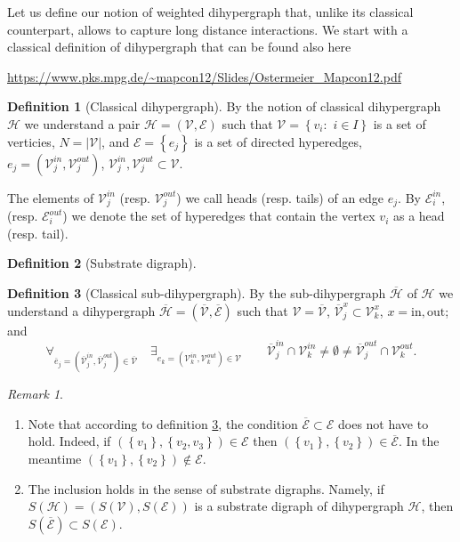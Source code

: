 \documentclass[a4paper,12pt]{article}
\theoremstyle{definition}
\newtheorem{definition}{Definition}%
\theoremstyle{remark}
\newtheorem{remark}{Remark}%
\newcommand{\HH}{\mathcal{H}}
\newcommand{\bHH}{\overline{\mathcal{H}}}
\newcommand{\V}{\mathcal{V}}
\newcommand{\bV}{\overline{\mathcal{V}}}
\newcommand{\E}{\mathcal{E}}
\newcommand{\bE}{\overline{\mathcal{E}}}
\begin{document}
Let us define our notion of weighted dihypergraph that, unlike its classical counterpart, allows to capture long distance interactions. We start with a classical definition of dihypergraph that can be found also here\newline

\url{https://www.pks.mpg.de/~mapcon12/Slides/Ostermeier_Mapcon12.pdf}

\begin{definition}[Classical dihypergraph]
By the notion of classical dihypergraph $\HH$ we understand a pair $\HH =\left(\V,\E\right)$ such that $\V=\left\{ v_i:\,\,i\in I\right\}$ is a set of verticies, $N=|\V|$,  and $\E=\left\{e_j\right\}$ is a set of directed hyperedges, $e_j=(\V_j^{in},\V_j^{out})$, $\V_j^{in},\V_j^{out}\subset \V$.
\end{definition}
The elements of $\V_j^{in}$ (resp. $\V_j^{out}$) we call heads (resp. tails) of an edge $e_j$. By $\E_i^{in}$, (resp. $ \E_i^{out}$) we denote the set of hyperedges that contain the vertex $v_i$ as a head (resp. tail).

\begin{definition}[Substrate digraph]
\end{definition}

\begin{definition}[Classical sub-dihypergraph]\label{def:clas_sub-dhg}
By the sub-dihypergraph $\bHH$ of $\HH$ we understand a dihypergraph $\bHH =\left(\bV,\bE\right)$ such that $\V=\bV$, $\bV_j^{x}\subset \V_k^{x}$, $x=\text{in},\text{out}$; and  
\[
\forall_{\overline{e}_j=\left(\bV_j^{in},\bV_j^{out}\right)\in \bV}\quad\exists_{e_k=\left(\V_k^{in},\V_k^{out}\right)\in \V}\qquad \bV_j^{in}\cap \V_k^{in}\neq \emptyset \neq \bV_j^{out}\cap \V_k^{out}. 
\]
\end{definition}
\begin{remark}
\begin{enumerate}
\item Note that according to definition \ref{def:clas_sub-dhg}, the condition $\bE\subset\E$ does not have to hold. Indeed, if $(\left\{v_1\right\},\left\{v_2,v_3\right\})\in \E$ then $(\left\{v_1\right\},\left\{v_2\right\})\in \bE$. In the meantime $(\left\{v_1\right\},\left\{v_2\right\})\notin \E$.

\item The inclusion holds in the sense of substrate digraphs. Namely, if $S(\HH)=\left(S(\V),S(\E)\right)$ is a substrate digraph of dihypergraph $\HH$, then $S(\bE)\subset S(\E)$.
\end{enumerate}
\end{remark}
\end{document}
